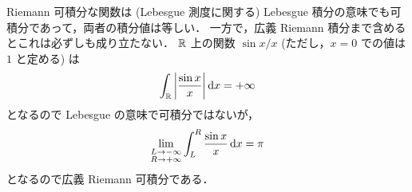 \begin{example}
    Riemann 可積分な関数は (Lebesgue 測度に関する) Lebesgue 積分の意味でも可積分であって，両者の積分値は等しい．
    一方で，広義 Riemann 積分まで含めるとこれは必ずしも成り立たない．
    $\mathbb{R}$ 上の関数 $\sin x/x$ (ただし，$x=0$ での値は $1$ と定める) は
    \begin{align*}
        \int_{\mathbb{R}}\left\lvert\frac{\sin x}{x}\right\rvert\mathrm{d} x=+\infty
    \end{align*}
    となるので Lebesgue の意味で可積分ではないが，
    \begin{align*}
        \lim_{\substack{L\to-\infty\\R\to+\infty}}\int_{L}^R\frac{\sin x}{x}\,\mathrm{d} x=\pi
    \end{align*}
    となるので広義 Riemann 可積分である．
\end{example}
